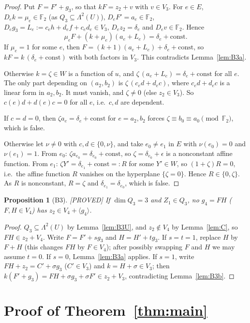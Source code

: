 \documentclass[11pt,a4paper]{article}
\theoremstyle{plain}
\newtheorem{proposition}[theorem]{Proposition}
\theoremstyle{definition}
\theoremstyle{remark}
\newcommand{\F}{\mathbb{F}_2}
\newcommand{\Lam}{\Lambda^{2}}
\newcommand{\status}[1]{\hfill\textsf{[#1]}}
\begin{document}
\begin{proof}
Put $F=F'+g_3$, so that $kF=z_2+v$ with $v\in V_3$. For $e\in E$, $D_ek=\mu_e\in\F$ (as $Q_3\subseteq\Lam(U)$), $D_eF'=a_e\in\F$, $D_eg_3=L_e:=c_eh+d_ef+c_ed_e\in V_3$, $D_ez_2=\delta_e$ and $D_ev\in\F$. Hence
\[
\mu_eF+(k+\mu_e)(a_e+L_e)=\delta_e+\text{const}.
\]
If $\mu_e=1$ for some $e$, then $F=(k+1)(a_e+L_e)+\delta_e+\text{const}$, so $kF=k\,(\delta_e+\text{const})$ with both factors in $V_3$. This contradicts Lemma~\ref{lem:B3a}.

Otherwise $k=\zeta\in W$ is a function of $u$, and $\zeta\,(a_e+L_e)=\delta_e+\text{const}$ for all $e$. The only part depending on $(a_2,b_2)$ is $\zeta\,(c_ed+d_ec)$, where $c_ed+d_ec$ is a linear form in $a_2,b_2$. It must vanish, and $\zeta\neq0$ (else $z_2\in V_3$). So $c(e)d+d(e)c=0$ for all $e$, i.e.\ $c,d$ are dependent.

If $c=d=0$, then $\zeta a_e=\delta_e+\text{const}$ for $e=a_2,b_2$ forces $\zeta\equiv b_0\equiv a_0\pmod{\F}$, which is false.

Otherwise let $\nu\neq0$ with $c,d\in\{0,\nu\}$, and take $e_0\neq e_1$ in $E$ with $\nu(e_0)=0$ and $\nu(e_1)=1$. From $e_0$: $\zeta a_{e_0}=\delta_{e_0}+\text{const}$, so $\zeta=\delta_{e_0}+\epsilon$ is a nonconstant affine function. From $e_1$: $\zeta Y'=\delta_{e_1}+\text{const}=:R$ for some $Y'\in W$, so $(1+\zeta)R=0$, i.e.\ the affine function $R$ vanishes on the hyperplane $\{\zeta=0\}$. Hence $R\in\{0,\zeta\}$. As $R$ is nonconstant, $R=\zeta$ and $\delta_{e_1}=\delta_{e_0}$, which is false.
\end{proof}

\begin{proposition}[B3]\label{prop:B3}\status{PROVED}
If $\dim Q_3=3$ and $Z_1\in Q_3$, no $g_4=FH$ ($F,H\in V_4$) has $z_2\in V_4+\langle g_4\rangle$.
\end{proposition}

\begin{proof}
$Q_3\subseteq\Lam(U)$ by Lemma~\ref{lem:B3U}, and $z_2\notin V_4$ by Lemma~\ref{lem:C}, so $FH\in z_2+V_4$. Write $F=F'+sg_3$ and $H=H'+tg_3$. If $s=t=1$, replace $H$ by $F+H$ (this changes $FH$ by $F\in V_4$); after possibly swapping $F$ and $H$ we may assume $t=0$. If $s=0$, Lemma~\ref{lem:B3a} applies. If $s=1$, write $FH+z_2=C'+\sigma g_3$ ($C'\in V_3$) and $k=H+\sigma\in V_3$; then $k(F'+g_3)=FH+\sigma g_3+\sigma F'\in z_2+V_3$, contradicting Lemma~\ref{lem:B3b}.
\end{proof}

\section{Proof of Theorem~\ref{thm:main}}\label{sec:proof}
\end{document}
